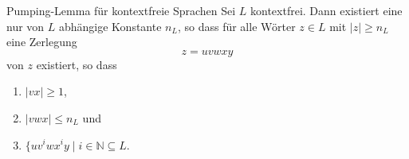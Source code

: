 \documentclass[a4paper,10pt]{article}
\begin{document}
\begin{subbox}{Pumping-Lemma für kontextfreie Sprachen}
    Sei $L$ kontextfrei. Dann existiert eine nur von $L$ abhängige Konstante $n_L$, so dass für alle Wörter $z \in L$ mit $|z| \geq n_L$ eine Zerlegung
    \[z = uvwxy\]
    von $z$ existiert, so dass
    \begin{enumerate}
        \item $|vx| \geq 1$,
        \item $|vwx| \leq n_L$ und
        \item $\{uv^iwx^iy \;|\; i \in \mathbb{N} \subseteq L$.
    \end{enumerate}
\end{subbox}
\end{document}
